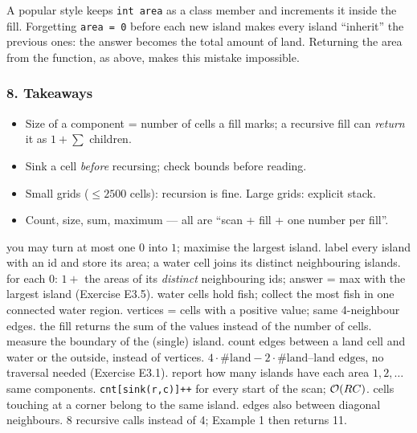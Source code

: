 \begin{warningbox}
A popular style keeps \texttt{int area} as a class member and increments it inside the fill. Forgetting \texttt{area = 0} before each new island makes every island ``inherit'' the previous ones: the answer becomes the total amount of land. Returning the area from the function, as above, makes this mistake impossible.
\end{warningbox}

\subsubsection*{8. Takeaways}

\begin{itemize}[leftmargin=*]
    \item Size of a component = number of cells a fill marks; a recursive fill can \emph{return} it as $1 + \sum$ children.
    \item Sink a cell \emph{before} recursing; check bounds before reading.
    \item Small grids ($\le 2500$ cells): recursion is fine. Large grids: explicit stack.
    \item Count, size, sum, maximum --- all are ``scan + fill + one number per fill''.
\end{itemize}

\begin{variantsbox}
  {you may turn at most one $0$ into $1$; maximise the largest island.}
  {label every island with an id and store its area; a water cell joins its distinct neighbouring islands.}
  {for each $0$: $1 + $ the areas of its \emph{distinct} neighbouring ids; answer = max with the largest island (Exercise E3.5).}
  {water cells hold fish; collect the most fish in one connected water region.}
  {vertices = cells with a positive value; same 4-neighbour edges.}
  {the fill returns the sum of the values instead of the number of cells.}
  {measure the boundary of the (single) island.}
  {count edges between a land cell and water or the outside, instead of vertices.}
  {$4\cdot\#\text{land} - 2\cdot\#\text{land--land edges}$, no traversal needed (Exercise E3.1).}
  {report how many islands have each area $1, 2, \dots$}
  {same components.}
  {\texttt{cnt[sink(r,c)]++} for every start of the scan; $\mathcal{O}(RC)$.}
  {cells touching at a corner belong to the same island.}
  {edges also between diagonal neighbours.}
  {8 recursive calls instead of 4; Example 1 then returns 11.}
\end{variantsbox}
